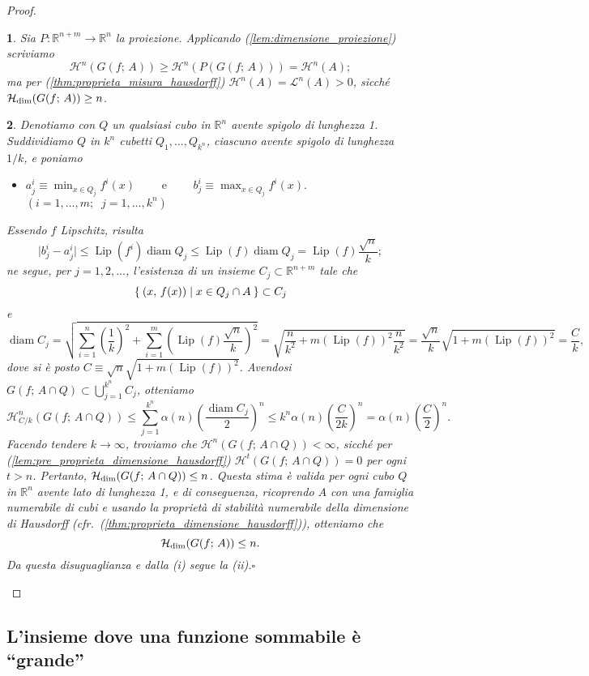 \documentclass[a4paper,10pt,openright,oneside]{book}
\theoremstyle{theoremstyle}
\theoremstyle{theoremstylewoheader}
\theoremstyle{theoremstyle}
\theoremstyle{proofsecstyle}
\newtheorem{proofsec}{}
\theoremstyle{nonumberplain}
\newtheorem{proof}{Dim.}
\newcommand{\RR}{\ensuremath{\mathbb{R}}}
\newcommand{\Leb}{\ensuremath{\mathcal{L}}}
\newcommand{\Haus}{\ensuremath{\mathcal{H}}}
\newcommand{\Hausdim}{\ensuremath{\Haus_\textup{dim}}}
\newcommand{\abs}[1]{\ensuremath{\lvert #1 \rvert}}
\DeclareMathOperator{\diam}{diam}
\DeclareMathOperator{\Lip}{Lip}
\renewcommand{\qedsymbol}{\ensuremath{\square}}
\newcommand{\qed}{\unskip\nobreak\hfill\nobreak\hspace{.5em}\qedsymbol}
\newcommand{\mymath}[2]{\begin{itemize}%
  \item[]\hfill\hbox{}\ensuremath{\displaystyle #1}\hfill\ensuremath{\displaystyle #2}%
  \end{itemize}}
\begin{document}
\begin{proof}
\begin{proofsec}
Sia $P : \RR^{n+m} \rightarrow \RR^n$ la proiezione. Applicando (\ref{lem:dimensione_proiezione}) scriviamo
\[
\Haus^n(G(f;\, A)) \ge \Haus^n(P(G(f;\, A))) = \Haus^n(A);
\]
ma per (\ref{thm:proprieta_misura_hausdorff}) $\Haus^n(A) = \Leb^n(A) > 0$, sicché $\Hausdim(G(f;\, A)) \ge n$.
\end{proofsec}

\begin{proofsec}
Denotiamo con $Q$ un qualsiasi cubo in $\RR^n$ avente spigolo di lunghezza 1. Suddividiamo $Q$ in $k^n$ cubetti $Q_1, \ldots, Q_{k^n}$, ciascuno avente spigolo di lunghezza $1/k$, e poniamo \mymath{a_j^i \equiv \min_{x \in Q_j} f^i(x) \qquad\text{ e }\qquad b_j^i \equiv \max_{x \in Q_j} f^i(x).}{(i = 1, \ldots, m;\;\; j = 1, \ldots, k^n)} Essendo $f$ Lipschitz, risulta
\[
\abs{b_j^i - a_j^i} \le \Lip(f^i) \diam Q_j \le \Lip(f) \diam Q_j = \Lip(f) \frac{\sqrt{n}}{k};
\]
ne segue, per $j = 1, 2, \ldots$, l'esistenza di un insieme $C_j \subset \RR^{n+m}$ tale che
\[
\Set{ (x,\, f(x)) | x \in Q_j \cap A } \subset C_j
\]
e
\[
\diam C_j = \sqrt{\sum_{i=1}^n \left(\frac{1}{k}\right)^2 + \sum_{i=1}^m \left(\Lip(f)\frac{\sqrt{n}}{k}\right)^2}
= \sqrt{\frac{n}{k^2} + m(\Lip(f))^2 \frac{n}{k^2}} = \frac{\sqrt{n}}{k} \sqrt{1 + m(\Lip(f))^2} = \frac{C}{k}, 
\]
dove si è posto $C \equiv \sqrt{n} \sqrt{1 + m(\Lip(f))^2}$. Avendosi $G(f;\, A \cap Q) \subset \bigcup_{j=1}^{k^n} C_j$, otteniamo
\[
\Haus_{C/k}^n(G(f;\, A \cap Q)) \le \sum_{j=1}^{k^n} \alpha(n) \left(\frac{\diam C_j}{2}\right)^n \le k^n \alpha(n) \left(\frac{C}{2k}\right)^n = \alpha(n) \left(\frac{C}{2}\right)^n.
\]
Facendo tendere $k \to \infty$, troviamo che $\Haus^n(G(f;\, A \cap Q)) < \infty$, sicché per (\ref{lem:pre_proprieta_dimensione_hausdorff}) $\Haus^t(G(f;\, A \cap Q)) = 0$ per ogni $t > n$. Pertanto, $\Hausdim(G(f;\, A \cap Q)) \le n$. Questa stima è valida per ogni cubo $Q$ in $\RR^n$ avente lato di lunghezza 1, e di conseguenza, ricoprendo $A$ con una famiglia numerabile di cubi e usando la proprietà di stabilità numerabile della dimensione di Hausdorff (\emph{cfr.}~(\ref{thm:proprieta_dimensione_hausdorff})), otteniamo che
\[
\Hausdim(G(f;\, A)) \le n.
\]
Da questa disuguaglianza e dalla (i) segue la (ii).\qed
\end{proofsec}
\end{proof}

\subsection{L'insieme dove una funzione sommabile è ``grande''}
\end{document}
